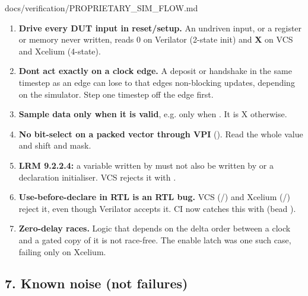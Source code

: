 \begin{relocated}{docs/verification/PROPRIETARY_SIM_FLOW.md}
\begin{enumerate}
\def\labelenumi{\arabic{enumi}.}
\tightlist
\item
  \textbf{Drive every DUT input in reset/\allowbreak{}setup.} An
  undriven input, or a register or memory never written, reads 0 on
  Verilator (2-state init) and \textbf{X} on VCS and Xcelium (4-state).
\item
  \textbf{Don\textquotesingle t act exactly on a clock edge.} A deposit
  or handshake in the same timestep as an edge can lose to that
  edge\textquotesingle s non-blocking updates, depending on the
  simulator. Step one timestep off the edge first.
\item
  \textbf{Sample data only when it is valid}, e.g.  only
  when . It is X otherwise.
\item
  \textbf{No bit-select on a packed vector through VPI}
  (). Read the whole value and shift and mask.
\item
  \textbf{LRM 9.2.2.4:} a variable written by  must not
  also be written by  or a declaration initialiser. VCS
  rejects it with .
\item
  \textbf{Use-before-declare in RTL is an RTL bug.} VCS
  (/) and Xcelium (/)
  reject it, even though Verilator accepts it. CI now catches this with
   (bead ).
\item
  \textbf{Zero-delay races.} Logic that depends on the delta order
  between a clock and a gated copy of it is not race-free. The
   enable latch was one such case, failing only on
  Xcelium.
\end{enumerate}

\subsection{7. Known noise (not failures)}\label{um:flow:proprietary-sim:7-known-noise-not-failures}

{\footnotesize\setlength{\tabcolsep}{3pt}

}
\end{relocated}
